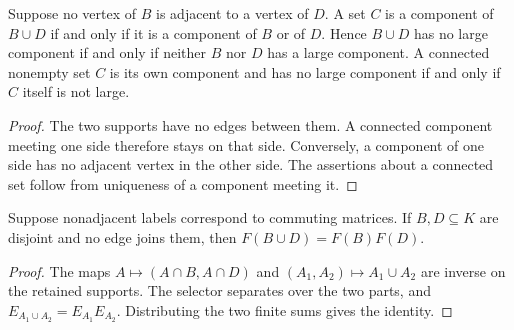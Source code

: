 \begin{lemma}
    \label{thm:clusters_separated_supports}
    \leanok
    Suppose no vertex of $B$ is adjacent to a vertex of $D$.
    A set $C$ is a component of $B\cup D$ if and only if it is a
    component of $B$ or of $D$. Hence $B\cup D$ has no large component
    if and only if neither $B$ nor $D$ has a large component.
    A connected nonempty set $C$ is its own component and has no
    large component if and only if $C$ itself is not large.
\end{lemma}
\begin{proof}\leanok
    The two supports have no edges between them. A connected component
    meeting one side therefore stays on that side. Conversely, a
    component of one side has no adjacent vertex in the other side.
    The assertions about a connected set follow from uniqueness of
    a component meeting it.
\end{proof}

\begin{lemma}
    \label{thm:retained_separated_sum_product}
    \leanok
    Suppose nonadjacent labels correspond to commuting matrices.
    If $B,D\subseteq K$ are disjoint and no edge joins them, then
    $F(B\cup D)=F(B)F(D)$.
\end{lemma}
\begin{proof}\leanok
    The maps $A\mapsto(A\cap B,A\cap D)$ and
    $(A_1,A_2)\mapsto A_1\cup A_2$ are inverse on the retained
    supports. The selector separates over the two parts, and
    $E_{A_1\cup A_2}=E_{A_1}E_{A_2}$. Distributing the two finite
    sums gives the identity.
\end{proof}


